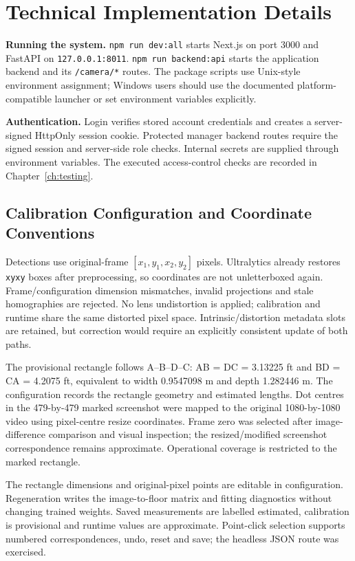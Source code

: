 \section{Technical Implementation Details}
\textbf{Running the system.} \texttt{npm run dev:all} starts Next.js on port 3000 and FastAPI on \texttt{127.0.0.1:8011}. \texttt{npm run backend:api} starts the application backend and its \texttt{/camera/*} routes. The package scripts use Unix-style environment assignment; Windows users should use the documented platform-compatible launcher or set environment variables explicitly.


\textbf{Authentication.} Login verifies stored account credentials and creates a server-signed HttpOnly session cookie. Protected manager backend routes require the signed session and server-side role checks. Internal secrets are supplied through environment variables. The executed access-control checks are recorded in Chapter~\ref{ch:testing}.

\subsection{Calibration Configuration and Coordinate Conventions}
Detections use original-frame $[x_1,y_1,x_2,y_2]$ pixels. Ultralytics already restores \texttt{xyxy} boxes after preprocessing, so coordinates are not unletterboxed again. Frame/configuration dimension mismatches, invalid projections and stale homographies are rejected. No lens undistortion is applied; calibration and runtime share the same distorted pixel space. Intrinsic/distortion metadata slots are retained, but correction would require an explicitly consistent update of both paths.

The provisional rectangle follows A--B--D--C: AB = DC = 3.13225 ft and BD = CA = 4.2075 ft, equivalent to width 0.9547098 m and depth 1.282446 m. The configuration records the rectangle geometry and estimated lengths. Dot centres in the 479-by-479 marked screenshot were mapped to the original 1080-by-1080 video using pixel-centre resize coordinates. Frame zero was selected after image-difference comparison and visual inspection; the resized/modified screenshot correspondence remains approximate. Operational coverage is restricted to the marked rectangle.

The rectangle dimensions and original-pixel points are editable in configuration. Regeneration writes the image-to-floor matrix and fitting diagnostics without changing trained weights. Saved measurements are labelled estimated, calibration is provisional and runtime values are approximate. Point-click selection supports numbered correspondences, undo, reset and save; the headless JSON route was exercised.

